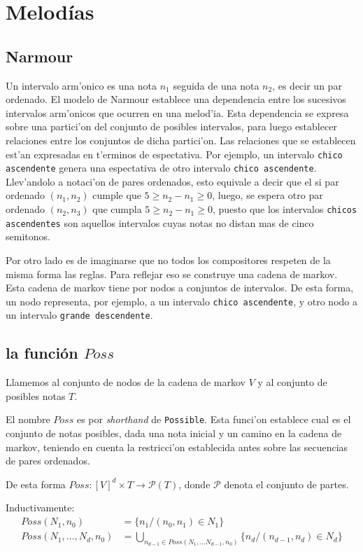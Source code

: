 
\section{Melod\'ias}
\subsection{Narmour}
Un intervalo arm'onico es una nota $n_1$ seguida de una nota $n_2$, es decir un par ordenado.
El modelo de Narmour establece una dependencia entre los sucesivos intervalos arm'onicos que ocurren en una melod'ia.
Esta dependencia se expresa sobre una partici'on del conjunto de posibles intervalos, para luego establecer relaciones entre los conjuntos de dicha partici'on.
Las relaciones que se establecen est'an expresadas en t'erminos de espectativa. Por ejemplo, un intervalo \texttt{chico ascendente} genera una espectativa de otro 
intervalo \texttt{chico ascendente}. Llev'andolo a notaci'on de pares ordenados, esto equivale a decir que el si par ordenado $(n_1, n_2)$ 
cumple que $5 \geq n_2 - n_1 \geq 0$, luego, se espera otro par ordenado $(n_2, n_3)$ que cumpla $5\geq n_2 - n_1 \geq 0$, 
puesto que los intervalos \texttt{chicos ascendentes} son aquellos intervalos cuyas notas no distan mas de cinco semitonos.

Por otro lado es de imaginarse que no todos los compositores respeten de la misma forma las reglas. Para reflejar eso se construye una cadena de markov.
Esta cadena de markov tiene por nodos a conjuntos de intervalos. De esta forma, un nodo representa, por ejemplo, a un intervalo \texttt{chico ascendente},
y otro nodo a un intervalo \texttt{grande descendente}. 

\subsection{la funci\'on $Poss$}
Llamemos al conjunto de nodos de la cadena de markov $V$ y al conjunto de posibles notas $T$.

El nombre $Poss$ es por \emph{shorthand} de \texttt{Possible}. Esta funci'on establece cual es el conjunto de notas posibles, dada una nota inicial y 
un camino en la cadena de markov, teniendo en cuenta la restricci'on establecida antes sobre las secuencias de pares ordenados.

De esta forma $Poss : [V]^d \times T \rightarrow \mathcal{P}(T)$, donde $\mathcal{P}$ denota el conjunto de partes.

Inductivamente:
\begin{align}
Poss(N_1, n_0)&= \{ n_1 / (n_0, n_1) \in N_1 \} \nonumber \\
Poss(N_1, \dots, N_d, n_0)&= \bigcup_{n_{d-1} \in Poss(N_1, \dots N_{d-1}, n_0)} \{ n_d / (n_{d-1}, n_d) \in N_d \} \nonumber
\end{align}


